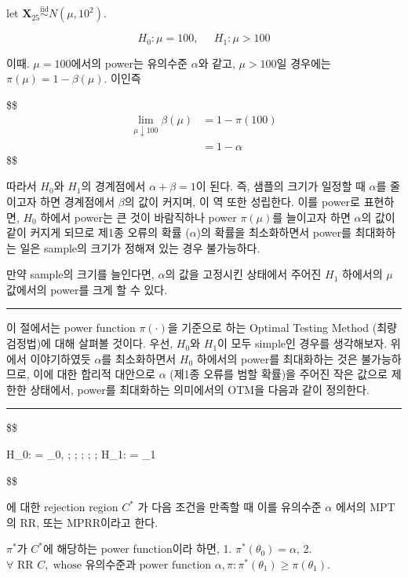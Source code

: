 \documentclass[
]{book}
\begin{document}
let \(\pmb X_{25} \overset {\text{iid}} {\sim} N(\mu, 10^2 )\).

\[
H_0 : \mu = 100, \; \; \; \; \; H_1 : \mu > 100
\]

이때. \(\mu=100\)에서의 power는 유의수준 \(\alpha\)와 같고, \(\mu>100\)일 경우에는 \(\pi(\mu) = 1-\beta(\mu)\). 이인즉

\$\$
\begin{align*}

\lim_{\mu \downarrow 100} \beta(\mu) &= 1- \pi(100) \\
&= 1- \alpha

\end{align*}
\$\$

따라서 \(H_0\)와 \(H_1\)의 경계점에서 \(\alpha + \beta = 1\)이 된다. 즉, 샘플의 크기가 일정할 때 \(\alpha\)를 줄이고자 하면 경계점에서 \(\beta\)의 값이 커지며, 이 역 또한 성립한다. 이를 power로 표현하면, \(H_0\) 하에서 power는 큰 것이 바람직하나 power \(\pi (\mu)\)를 늘이고자 하면 \(\alpha\)의 값이 같이 커지게 되므로 제1종 오류의 확률 (\(\alpha\))의 확률을 최소화하면서 power를 최대화하는 일은 sample의 크기가 정해져 있는 경우 불가능하다.

만약 sample의 크기를 늘인다면, \(\alpha\)의 값을 고정시킨 상태에서 주어진 \(H_1\) 하에서의 \(\mu\) 값에서의 power를 크게 할 수 있다.

\begin{center}\rule{0.5\linewidth}{0.5pt}\end{center}

이 절에서는 power function \(\pi(\cdot)\)을 기준으로 하는 Optimal Testing Method (최량검정법)에 대해 살펴볼 것이다. 우선, \(H_0\)와 \(H_1\)이 모두 simple인 경우를 생각해보자. 위에서 이야기하였듯 \(\alpha\)를 최소화하면서 \(H_0\) 하에서의 power를 최대화하는 것은 불가능하므로, 이에 대한 합리적 대안으로 \(\alpha\) (제1종 오류를 범할 확률)을 주어진 작은 값으로 제한한 상태에서, power를 최대화하는 의미에서의 OTM을 다음과 같이 정의한다.

\begin{center}\rule{0.5\linewidth}{0.5pt}\end{center}

\$\$

H\_0: \theta = \theta\_0, ; ; ; ; ; H\_1: \theta = \theta\_1

\$\$

에 대한 rejection region \(C^\ast\) 가 다음 조건을 만족할 때 이를 유의수준 \(\alpha\) 에서의 MPT의 RR, 또는 MPRR이라고 한다.

\(\pi^\ast\)가 \(C^\ast\)에 해당하는 power function이라 하면,
1. \(\pi^\ast (\theta_0) = \alpha\),
2. \(\forall \text{ RR } C, \; \text{whose 유의수준과 power function } \alpha, \pi: \pi^\ast(\theta_1) \ge \pi(\theta_1)\).
\end{document}
